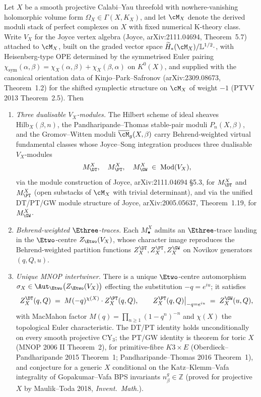 \begin{theorem}
\label{thm:mnop-generic-cy3-joyce-kps}
Let $X$ be a smooth projective Calabi--Yau threefold with nowhere-vanishing
holomorphic volume form $\Omega_X\in\Gamma(X, K_X)$, and let $\cM_X$ denote
the derived moduli stack of perfect complexes on $X$ with fixed numerical
K-theory class. Write $V_X$ for the Joyce vertex algebra
(Joyce, arXiv:2111.04694, Theorem~5.7) attached to $\cM_X$, built on the
graded vector space $\widetilde H_*(\cM_X)/\mathbb{L}^{1/2}\cdot$, with
Heisenberg-type OPE determined by the symmetrised Euler pairing
$\chi_{\mathrm{sym}}(\alpha, \beta) = \chi_X(\alpha, \beta) + \chi_X(\beta, \alpha)$
on $K^0(X)$, and supplied with the canonical orientation data of
Kinjo--Park--Safronov (arXiv:2309.08673, Theorem~1.2) for the shifted
symplectic structure on $\cM_X$ of weight $-1$ (PTVV 2013 Theorem~2.5).
Then
\begin{enumerate}[label=\textup{(\roman*)}]
\item \emph{Three dualisable $V_X$-modules.} The Hilbert scheme of ideal
sheaves $\mathrm{Hilb}_X(\beta, n)$, the Pandharipande--Thomas stable-pair
moduli $P_n(X, \beta)$, and the Gromov--Witten moduli
$\overline\cM_g(X, \beta)$ carry Behrend-weighted virtual fundamental
classes whose Joyce--Song integration produces three dualisable
$V_X$-modules
\[
 M_{\DT}^X, \quad M_{\PT}^X, \quad M_{\GW}^X \;\in\; \mathrm{Mod}(V_X),
\]
via the module construction of Joyce, arXiv:2111.04694 \S5.3, for
$M_{\DT}^X$ and $M_{\PT}^X$ (open substacks of $\cM_X$ with trivial
determinant), and via the unified DT/PT/GW module structure of Joyce,
arXiv:2005.05637, Theorem~1.19, for $M_{\GW}^X$.
\item \emph{Behrend-weighted $\Ethree$-traces.} Each $M_\bullet^X$ admits
an $\Ethree$-trace landing in the $\Etwo$-centre $Z_{\Etwo}(V_X)$, whose
character image reproduces the Behrend-weighted partition functions
$Z^{\DT}_X, Z^{\PT}_X, Z^{\GW}_X$ on Novikov generators $(q, Q, u)$.
\item \emph{Unique MNOP intertwiner.} There is a unique $\Etwo$-centre
automorphism $\sigma_X\in\Aut_{\Etwo}\bigl(Z_{\Etwo}(V_X)\bigr)$
effecting the substitution $-q = e^{iu}$; it satisfies
\[
 Z^{\DT}_X(q, Q)
 \;=\; M(-q)^{\chi(X)}\cdot Z^{\PT}_X(q, Q), \qquad
 Z^{\PT}_X(q, Q)\big|_{-q = e^{iu}}
 \;=\; Z^{\GW}_X(u, Q),
\]
with MacMahon factor $M(q) = \prod_{n\geq 1}(1 - q^n)^{-n}$ and
$\chi(X)$ the topological Euler characteristic. The DT/PT identity
holds unconditionally on every smooth projective CY$_3$; the
PT/GW identity is theorem for toric $X$ (MNOP 2006 II Theorem~2),
for primitive-fibre $K3\times E$ (Oberdieck--Pandharipande 2015 Theorem~1;
Pandharipande--Thomas 2016 Theorem~1), and conjecture for a generic
$X$ conditional on the Katz--Klemm--Vafa integrality of
Gopakumar--Vafa BPS invariants $n^g_\beta\in\mathbb{Z}$
(proved for projective $X$ by Maulik--Toda 2018, \emph{Invent.~Math.}).
\end{enumerate}
\end{theorem}

